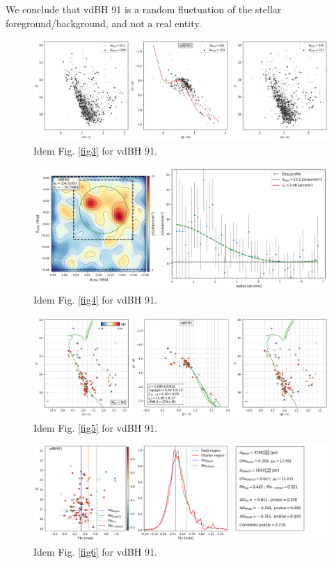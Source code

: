 \documentclass[draft]{aa}
\begin{document}
We conclude that vdBH 91 is a random fluctuation of the stellar
foreground/background, and not a real entity.

\begin{figure}[ht]
    \centering
    \includegraphics[width=\hsize]{../figs/obs_vdBH91.png}
    \caption{Idem Fig. \ref{fig3} for vdBH 91.}
    \label{fig27}
\end{figure}
\begin{figure}[ht]
    \centering
    \includegraphics[width=\hsize]{../figs/dmap_vdbh91.png}
    \caption{Idem Fig. \ref{fig4} for vdBH 91.}
    \label{fig28}
\end{figure}
\begin{figure}[ht]
    \centering
    \includegraphics[width=\hsize]{../figs/cmds_vdBH91.png}
    \caption{Idem Fig. \ref{fig5} for vdBH 91.}
    \label{fig29}
\end{figure}
\begin{figure}[ht]
    \centering
    \includegraphics[width=\hsize]{../figs/plx_vdBH91.png}
    \caption{Idem Fig. \ref{fig6} for vdBH 91.}
    \label{fig30}
\end{figure}
\end{document}
